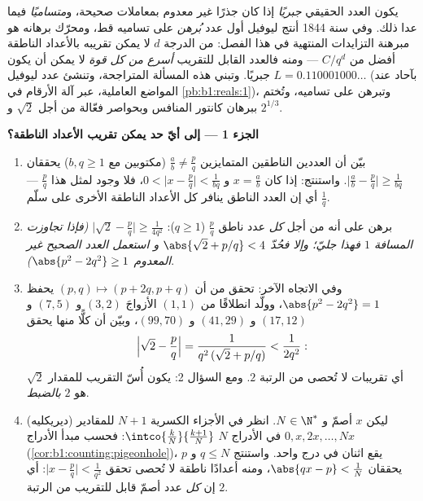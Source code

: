 \begin{problem}
\label{pb:b1:derivative:1}
يكون العدد الحقيقي \emph{جبريًا} إذا كان جذرًا 
غير معدوم بمعاملات صحيحة، و\emph{متساميًا}
فيما عدا ذلك. وفي سنة 1844 أنتج ليوفيل أول عدد \emph{بُرهن}
على تساميه قط، ومحرّك برهانه هو
مبرهنة التزايدات المنتهية في هذا الفصل:  من الدرجة $d$
لا يمكن تقريبه بالأعداد الناطقة أفضل من $C/q^d$ --- ومنه فالعدد
القابل للتقريب \emph{أسرع من كل قوة} لا يمكن أن يكون
جبريًا. وتبني هذه المسألة المتراجحة، وتنشئ
عدد ليوفيل $L = 0.110001000\dots$ (بآحاد عند المواضع
العاملية، عبر آلة الأرقام في \cref{pb:b1:reals:1})،
وتبرهن على تساميه، وتُختم ببرهان كانتور المنافس وبحواصر
فعّالة من أجل $\sqrt2$ و
$2^{1/3}$.

\medskip
\noindent\textbf{الجزء 1 --- إلى أيّ حد يمكن تقريب الأعداد
الناطقة؟}
\begin{enumerate}
  \item بيّن أن العددين الناطقين المتمايزين $\frac ab \neq \frac pq$
        (مكتوبين مع $b, q \geq 1$) يحققان $\bigl|\frac ab -
        \frac pq\bigr| \geq \frac{1}{bq}$. واستنتج: إذا كان $x =
        \frac ab$ و $0 < \bigl|x - \frac pq\bigr| <
        \frac{1}{bq}$، فلا وجود لمثل هذا $\frac pq$ --- أي إن العدد الناطق
        ينافر كل الأعداد الناطقة الأخرى على سلّم $\frac 1q$.
  \item برهن على أنه من أجل \emph{كل} عدد ناطق $\frac pq$ ($q \geq
        1$): $\bigl|\sqrt2 - \frac pq\bigr| \geq
        \frac{1}{4q^2}$ \emph{(فإذا تجاوزت المسافة $1$ فهذا
        جليّ؛ وإلا فحُدّ $\abs{\sqrt2 + p/q} < 4$ و
        استعمل العدد الصحيح غير المعدوم $\abs{p^2 - 2q^2} \geq 1$)}.
  \item وفي الاتجاه الآخر: تحقق من أن $(p, q) \mapsto (p +
        2q, p + q)$ يحفظ $\abs{p^2 - 2q^2} = 1$، وولّد
        انطلاقًا من $(1,1)$ الأزواجَ $(3,2)$ و $(7,5)$ و $(17,12)$ و
        $(41,29)$ و $(99,70)$، وبيّن أن كلًّا منها يحقق
        \[
        \Bigl|\sqrt2 - \frac pq\Bigr| =
        \frac{1}{q^2\,(\sqrt2 + p/q)} < \frac{1}{2q^2} :
        \]
        أي تقريبات لا تُحصى من الرتبة $2$. ومع
        السؤال 2: يكون أُسّ التقريب للمقدار $\sqrt 2$
        هو $2$ \emph{بالضبط}.
  \item (ديريكليه) ليكن $x$ أصمّ و $N \in \N^*$.
        انظر في الأجزاء الكسرية $N + 1$ للمقادير $0, x, 2x,
        \dots, Nx$ في الأدراج $N$ $\intco{\frac kN}{\frac{k +
        1}{N}}$: فحسب مبدأ الأدراج
        (\cref{cor:b1:counting:pigeonhole})، يقع اثنان في درج واحد.
        واستنتج $q \leq N$ و $p$ يحققان $\abs{qx - p} <
        \frac 1N$، ومنه أعدادًا ناطقة لا تُحصى تحقق
        $\bigl|x - \frac pq\bigr| < \frac{1}{q^2}$: أي إن \emph{كل}
        عدد أصمّ قابل للتقريب من الرتبة $2$.
\end{enumerate}


\end{problem}
